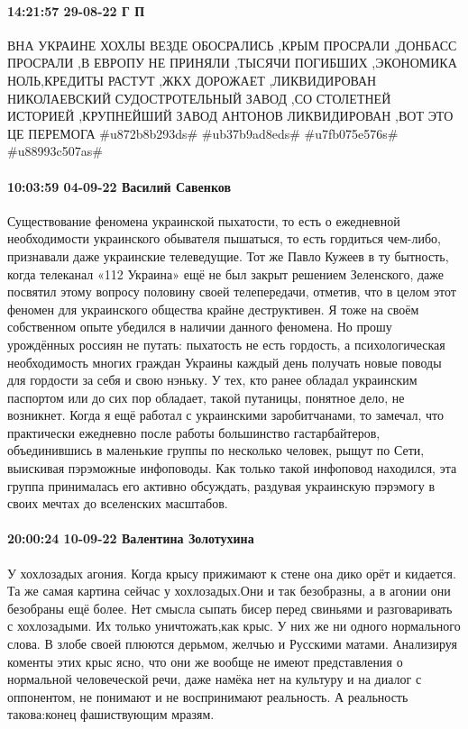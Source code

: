 \paragraph{14:21:57 29-08-22 Г П}

ВНА УКРАИНЕ ХОХЛЫ ВЕЗДЕ ОБОСРАЛИСЬ ,КРЫМ ПРОСРАЛИ ,ДОНБАСС ПРОСРАЛИ ,В ЕВРОПУ
НЕ ПРИНЯЛИ ,ТЫСЯЧИ ПОГИБШИХ ,ЭКОНОМИКА НОЛЬ,КРЕДИТЫ РАСТУТ ,ЖКХ ДОРОЖАЕТ
,ЛИКВИДИРОВАН НИКОЛАЕВСКИЙ СУДОСТРОТЕЛЬНЫЙ ЗАВОД ,СО СТОЛЕТНЕЙ ИСТОРИЕЙ
,КРУПНЕЙШИЙ ЗАВОД АНТОНОВ ЛИКВИДИРОВАН ,ВОТ ЭТО ЦЕ ПЕРЕМОГА #u872b8b293ds#
#ub37b9ad8eds# #u7fb075e576s# #u88993c507as#


\paragraph{10:03:59 04-09-22 Василий Савенков}

Существование феномена украинской пыхатости, то есть о ежедневной необходимости украинского обывателя пышатыся, то есть гордиться чем-либо, признавали даже украинские телеведущие.
Тот же Павло Кужеев в ту бытность, когда телеканал «112 Украина» ещё не был закрыт решением Зеленского, даже посвятил этому вопросу половину своей телепередачи, отметив, что в целом этот феномен для украинского общества крайне деструктивен.
Я тоже на своём собственном опыте убедился в наличии данного феномена.
Но прошу урождённых россиян не путать: пыхатость не есть гордость, а психологическая необходимость многих граждан Украины каждый день получать новые поводы для гордости за себя и свою нэньку.
У тех, кто ранее обладал украинским паспортом или до сих пор обладает, такой путаницы, понятное дело, не возникнет.
Когда я ещё работал с украинскими заробитчанами, то замечал, что практически ежедневно после работы большинство гастарбайтеров, объединившись в маленькие группы по несколько человек, рыщут по Сети, выискивая пэрэможные инфоповоды. Как только такой инфоповод находился, эта группа принималась его активно обсуждать, раздувая украинскую пэрэмогу в своих мечтах до вселенских масштабов.

\paragraph{20:00:24 10-09-22 Валентина Золотухина}

У хохлозадых агония. Когда крысу прижимают к стене она дико орёт и кидается. Та
же самая картина сейчас у хохлозадых.Они и так безобразны, а в агонии они
безобраны ещё более. Нет смысла сыпать бисер перед свиньями и разговаривать с
хохлозадыми. Их только уничтожать,как крыс. У них же ни одного нормального
слова. В злобе своей плюются дерьмом, желчью и Русскими матами. Анализируя
коменты этих крыс ясно, что они же вообще не имеют представления о нормальной
человеческой речи, даже намёка нет на культуру и на диалог с оппонентом, не
понимают и не воспринимают реальность. А реальность такова:конец фашиствующим
мразям.


